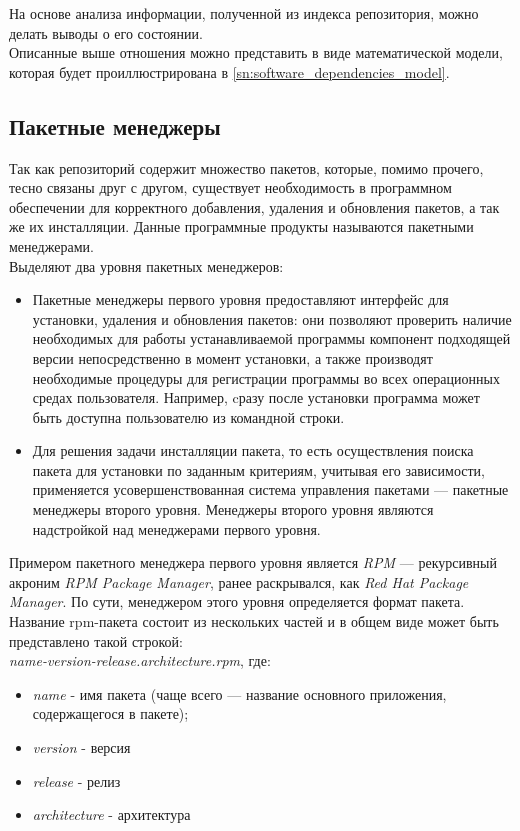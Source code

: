 На основе анализа информации, полученной из индекса репозитория,
можно делать выводы о его состоянии. \\

Описанные выше отношения можно представить в виде математической модели,
которая будет проиллюстрирована в \ref{sn:software_dependencies_model}.


\subsection{Пакетные менеджеры}
Так как репозиторий содержит множество пакетов, которые, помимо прочего, тесно
связаны друг с другом, существует необходимость в программном обеспечении для
корректного добавления, удаления и обновления пакетов, а так же их инсталляции.
Данные программные продукты называются пакетными менеджерами.\\

Выделяют два уровня пакетных менеджеров:
\begin{itemize}
\item{Пакетные менеджеры первого уровня предоставляют интерфейс для установки,
удаления и обновления пакетов: они позволяют проверить наличие необходимых для
работы устанавливаемой программы компонент подходящей версии непосредственно 
в момент установки, а также производят необходимые процедуры для регистрации 
программы во всех операционных средах пользователя. Например, cразу после установки 
программа может быть доступна пользователю из командной строки.}
\item{Для решения задачи инсталляции пакета, то есть осуществления поиска пакета для
установки по заданным критериям, учитывая его зависимости, применяется усовершенствованная
система управления пакетами --- пакетные менеджеры второго уровня. Менеджеры второго уровня 
являются надстройкой над менеджерами первого уровня.}
\end{itemize}

Примером пакетного менеджера первого уровня является  \textit{RPM} --- рекурсивный акроним 
\textit{RPM Package Manager}, ранее раскрывался, как \textit{Red Hat Package Manager}.
По сути, менеджером этого уровня определяется формат пакета.\\

Название rpm-пакета состоит из нескольких частей и в общем виде может быть представлено
такой строкой: \\
\textit{name-version-release.architecture.rpm}, где:
\begin{itemize}
\item{\textit{name} - имя пакета (чаще всего --- название основного приложения, содержащегося в пакете);}
\item{\textit{version} - версия}
\item{\textit{release} - релиз}
\item{\textit{architecture} - архитектура}
\end{itemize}

